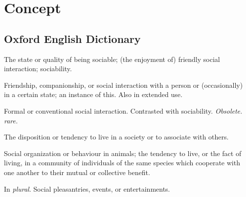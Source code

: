 \section{Concept}
	\label{SOCIALITY}
	



\subsection{Oxford English Dictionary} %
	\label{SOCIALITY-OED}

	\begin{compactitem}
		\item[1.a] The state or quality of being sociable; (the enjoyment of) friendly social interaction; sociability.
		\item[1.b] Friendship, companionship, or social interaction with a person or (occasionally) in a certain state; an instance of this. Also in extended use.
		\item[1.c] Formal or conventional social interaction. Contrasted with sociability. \textit{Obsolete. rare.}
		\item[2.a] The disposition or tendency to live in a society or to associate with others.
		\item[2.b] Social organization or behaviour in animals; the tendency to live, or the fact of living, in a community of individuals of the same species which cooperate with one another to their mutual or collective benefit.
		\item[3] In \textit{plural}. Social pleasantries, events, or entertainments.
	\end{compactitem}

